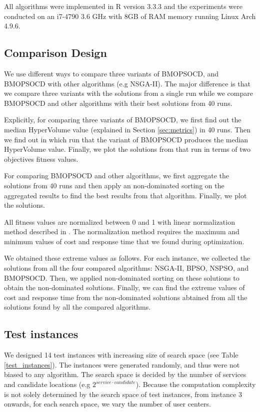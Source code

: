 \documentclass[10pt,journal,compsoc]{IEEEtran}
\begin{document}
All algorithms were implemented in R version 3.3.3 and the experiments were conducted on an i7-4790 3.6 GHz with 8GB of RAM memory running Linux Arch 4.9.6.
\subsection{Comparison Design}
We use different ways to compare three variants of BMOPSOCD, and BMOPSOCD with other algorithms (e.g NSGA-II). The major difference is that we compare three variants with the solutions from a single run while we compare BMOPSOCD and other algorithms with their best solutions from 40 runs.

Explicitly, for comparing three variants of BMOPSOCD, we first find out the median HyperVolume value (explained in Section \ref{sec:metrics}) in 40 runs. Then we find out in which run that the variant of BMOPSOCD produces the median HyperVolume value. Finally, we plot the solutions from that run in terms of two objectives fitness values.

For comparing BMOPSOCD and other algorithms, we first aggregate the solutions from 40 runs and then apply an non-dominated sorting on the aggregated results to find the best results from that algorithm. Finally, we plot the solutions. 

All fitness values are normalized between 0 and 1 with linear normalization method described in \cite{Tan2016}. 
The normalization method requires the maximum and minimum values of cost and response time 
that we found during optimization. 

We obtained these extreme values as follows. For each instance, we collected the solutions from all the four compared algorithms: NSGA-II, BPSO, NSPSO, and BMOPSOCD. Then, we applied non-dominated sorting on these solutions to obtain the non-dominated solutions. Finally, we can find the extreme values of cost and response time from the non-dominated solutions abtained from all the solutions found by all the compared algorithms.

\subsection{Test instances}
\label{sec:datasets}





We designed 14 test instances with increasing size of search space (see Table \ref{test_instances}). The instances were generated randomly, and thus were not biased to any algorithm. The search space is decided by the number of services and candidate locations (e.g $2^{service \cdot candidate}$). Because the computation complexity is not solely determined by the search space of test instances, from instance 3 onwards, for each search space, we vary the number of user centers. 
\end{document}
